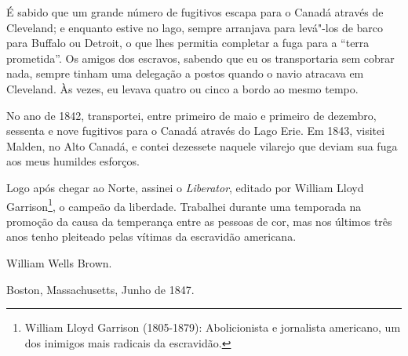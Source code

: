 É sabido que um grande número de fugitivos escapa para o Canadá através
de Cleveland; e enquanto estive no lago, sempre arranjava para levá"-los
de barco para Buffalo ou Detroit, o que lhes permitia completar a fuga
para a ``terra prometida''. Os amigos dos escravos, sabendo que eu os
transportaria sem cobrar nada, sempre tinham uma delegação a postos
quando o navio atracava em Cleveland. Às vezes, eu levava quatro ou
cinco a bordo ao mesmo tempo.

No ano de 1842, transportei, entre primeiro de maio e primeiro de
dezembro, sessenta e nove fugitivos para o Canadá através do Lago Erie.
Em 1843, visitei Malden, no Alto Canadá, e contei dezessete naquele
vilarejo que deviam sua fuga aos meus humildes esforços.

Logo após chegar ao Norte, assinei o \emph{Liberator}, editado por
William Lloyd Garrison\footnote{William Lloyd Garrison (1805-1879):
  Abolicionista e jornalista americano, um dos inimigos mais radicais da
  escravidão.}, o campeão da liberdade. Trabalhei durante uma temporada
na promoção da causa da temperança entre as pessoas de cor, mas nos
últimos três anos tenho pleiteado pelas vítimas da escravidão americana.

\begin{flushright}
William Wells Brown.
\end{flushright}

Boston, Massachusetts, Junho de 1847.
